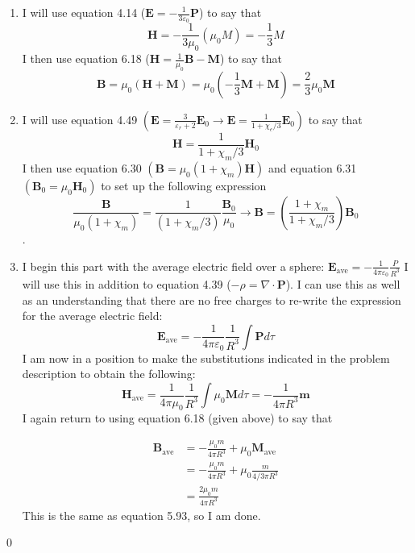 \documentclass{homework}
\newcommand\ve{\varepsilon}
\newcommand{\bs}[1]{\ensuremath{\boldsymbol{#1}}}
\newcommand{\pfrac}[2]{
    \ensuremath{ \left( \frac{#1}{#2} \right)}
  }
\begin{document}
\begin{homeworkProblem}[Problem 6.25]
{    \begin{enumerate}
      \item I will use equation 4.14 ($\bs{E} = - \frac{1}{3 \ve_0} \bs{P}$) to say that $$\bs{H} = - \frac{1}{3 \mu_0} (\mu_0 M) = - \frac{1}{3} M$$ I then use equation 6.18 ($\bs{H} = \frac{1}{\mu_0} \bs{B} - \bs{M}$) to say that $$\bs{B} = \mu_0 (\bs{H} + \bs{M}) = \mu_0 (- \frac{1}{3} \bs{M} + \bs{M}) = \frac{2}{3} \mu_0 \bs{M}$$
      \item I will use equation 4.49 $ \left(\bs{E} = \frac{3}{\ve_r + 2} \bs{E}_0 \rightarrow \bs{E} = \frac{1}{1 + \chi_e / 3} \bs{E}_0 \right)$ to say that $$\bs{H} = \frac{1}{1  + \chi_m / 3}\bs{H}_0$$ I then use equation 6.30 $\left(\bs{B} = \mu_0 (1 +  \chi_m) \bs{H}\right)$ and equation 6.31 $\left( \bs{B}_0 = \mu_0 \bs{H}_0 \right) $ to set up the following expression $$\frac{\bs{B}}{\mu_0 (1 + \chi_m)} = \frac{1}{(1 + \chi_m / 3)}\frac{\bs{B}_0}{\mu_0} \rightarrow \bs{B} = \pfrac{1 + \chi_m}{1 + \chi_m / 3} \bs{B}_0$$.
      \item I begin this part with the average electric field over a sphere: $\bs{E}_{\text{ave}} = - \frac{1}{4 \pi \ve_0} \frac{P}{R^3}$ I will use this in addition to equation 4.39 ($- \rho = \nabla \cdot \bs{P}$). I can use this as well as an understanding that there are no free charges to re-write the expression for the average electric field: $$\bs{E}_{\text{ave}} = - \frac{1}{4 \pi \ve_0} \frac{1}{R^3} \int \bs{P} d \tau$$ I am now in a position to make the substitutions indicated in the problem description to obtain the following: $$\bs{H}_{\text{ave}} = \frac{1}{4 \pi \mu_0} \frac{1}{R^3} \int \mu_0 \bs{M} d \tau = - \frac{1}{4 \pi R^3} \bs{m}$$ I again return to using equation 6.18 (given above) to say that

        \begin{align*}
          \bs{B}_{\text{ave}} &= -\frac{\mu_0 m}{4 \pi R^3} + \mu_0 \bs{M}_{\text{ave}} \\
            &= -\frac{\mu_0 m}{4 \pi R^3} + \mu_0 \frac{m}{4/3 \pi R^3} \\
            &=\frac{2 \mu_0 m}{4 \pi R^3}
        \end{align*}
        This is the same as equation 5.93, so I am done.

    \end{enumerate}

    \qed
  }
\end{homeworkProblem}
\end{document}
